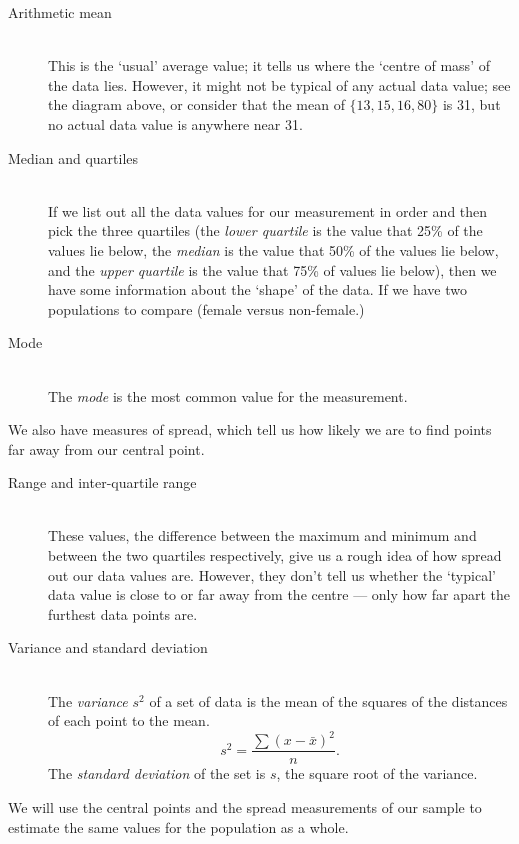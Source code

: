 \begin{description}
  \item[Arithmetic mean] \hfill \\
    This is the `usual' average value; it tells us where the `centre of mass' of the data lies. However,
    it might not be typical of any actual data value; see the diagram above, or consider that the
    mean of $\{13,15,16,80\} $ is 31, but no actual data value is anywhere near 31.
  \item[Median and quartiles] \hfill \\
    If we list out all the data values for our measurement in order and then pick the three quartiles (the \emph{lower quartile}
    is the value that 25\% of the values lie below, the \emph{median} is the value that 50\% of the values lie below, and the
    \emph{upper quartile} is the value that 75\% of values lie below), then we have some information about the `shape' of the
    data. If we have two populations to compare (female versus non-female.)
  \item[Mode] \hfill \\
    The \emph{mode} is the most common value for the measurement.
\end{description}

We also have measures of spread, which tell us how likely we are to find points far away from our central point.
\begin{description}
  \item[Range and inter-quartile range] \hfill \\
    These values, the difference between the maximum and minimum and between the two quartiles respectively, give us
    a rough idea of how spread out our data values are. However, they don't tell us whether the `typical' data value
    is close to or far away from the centre --- only how far apart the furthest data points are.
  \item[Variance and standard deviation] \hfill \\
    The \emph{variance} $ s^2 $ of a set of data is the mean of the squares of the distances of each point to the mean.
    \begin{displaymath}
      s^2 = \frac{\sum (x - \bar x)^2}{n}.
    \end{displaymath}
    The \emph{standard deviation} of the set is $ s $, the square root of the variance.
\end{description}

We will use the central points and the spread measurements of our sample to estimate the same values
for the population as a whole.

